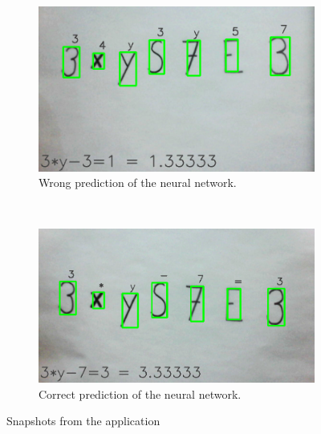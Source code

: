 \documentclass[12pt]{report}
\begin{document}
\begin{figure}[!ht]
    \centering
    \begin{subfigure}[b]{0.4\textwidth}
        \includegraphics[width=\textwidth]{Images/bad_result.png}
        \caption{Wrong prediction of the neural network.}
        \label{fig:result_bad}
    \end{subfigure}
    ~ %
    \begin{subfigure}[b]{0.4\textwidth}
        \includegraphics[width=\textwidth]{Images/good_result.png}
        \caption{Correct prediction of the neural network.}
        \label{fig:result_good}
    \end{subfigure}
  
    \caption{Snapshots from the application}\label{fig:result}
\end{figure}
\end{document}
